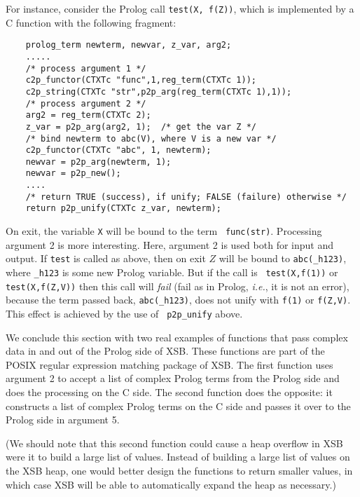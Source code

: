 For instance, consider the Prolog call {\tt test(X, f(Z))},
which is implemented by a C function with the following fragment:
\begin{verbatim}
    prolog_term newterm, newvar, z_var, arg2;
    .....
    /* process argument 1 */
    c2p_functor(CTXTc "func",1,reg_term(CTXTc 1));
    c2p_string(CTXTc "str",p2p_arg(reg_term(CTXTc 1),1));
    /* process argument 2 */
    arg2 = reg_term(CTXTc 2);
    z_var = p2p_arg(arg2, 1);  /* get the var Z */
    /* bind newterm to abc(V), where V is a new var */
    c2p_functor(CTXTc "abc", 1, newterm);
    newvar = p2p_arg(newterm, 1);
    newvar = p2p_new();
    ....
    /* return TRUE (success), if unify; FALSE (failure) otherwise */
    return p2p_unify(CTXTc z_var, newterm);
\end{verbatim}
On exit, the variable {\tt X} will be bound to the term {\tt
  func(str)}.  Processing argument 2 is more interesting. Here,
argument 2 is used both for input and output. If {\tt test} is called
as above, then on exit $Z$ will be bound to {\tt abc(\_h123)}, where
{\tt \_h123} is some new Prolog variable. But if the call is {\tt
  test(X,f(1))} or {\tt test(X,f(Z,V))} then this call will
\emph{fail} (fail as in Prolog, {\it i.e.}, it is not an error),
because the term passed back, {\tt abc(\_h123)}, does not unify with
{\tt f(1)} or {\tt f(Z,V)}. This effect is achieved by the use of {\tt
  p2p\_unify} above.

We conclude this section with two real examples of functions that pass complex data
in and out of the Prolog side of XSB. These functions are part of the
POSIX regular expression matching package of XSB. The first function
uses argument 2 to accept a list of complex Prolog terms from the
Prolog side and does the processing on the C side. The second function
does the opposite: it constructs a list of complex Prolog terms on the
C side and passes it over to the Prolog side in argument 5.  

(We should note that this second function could cause a heap overflow
in XSB were it to build a large list of values.  Instead of building a
large list of values on the XSB heap, one would better design the
functions to return smaller values, in which case XSB will be able to
automatically expand the heap as necessary.)

